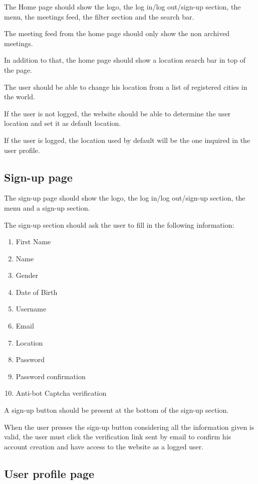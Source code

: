 \documentclass[conference]{IEEEtran}
\begin{document}
The Home page should show the logo, the log in/log out/sign-up section, the menu, the meetings feed, the filter section and the search bar.

The meeting feed from the home page should only show the non archived meetings.

In addition to that, the home page should show a location search bar in top of the page. 

The user should be able to change his location from a list of registered cities in the world.

If the user is not logged, the website should be able to determine the user location and set it as default location.

If the user is logged, the location used by default will be the one inquired in the user profile.

\subsection{Sign-up page}

The sign-up page should show the logo, the log in/log out/sign-up section, the menu and a sign-up section.

The sign-up section should ask the user to fill in the following information:

\begin{enumerate}
    \item First Name
    \item Name
    \item Gender
    \item Date of Birth
    \item Username
    \item Email
    \item Location
    \item Password
    \item Password confirmation
    \item Anti-bot Captcha verification
\end{enumerate}

A sign-up button should be present at the bottom of the sign-up section.

When the user presses the sign-up button considering all the information given is valid, the user must click the verification link sent by email to confirm his account creation and have access to the website as a logged user.

\subsection{User profile page}
\end{document}
